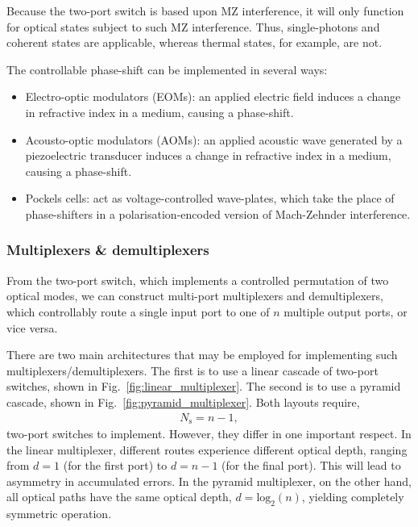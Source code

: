 \documentclass[aps, rmp, twocolumn, amsmath, amssymb, nofootinbib, superscriptaddress, longbibliography, floatfix, table-of-contents, eqsecnum]{revtex4-1}
\begin{document}
Because the two-port switch is based upon MZ interference, it will only function for optical states subject to such MZ interference. Thus, single-photons and coherent states are applicable, whereas thermal states, for example, are not.

The controllable phase-shift can be implemented in several ways:
\begin{itemize}
\item Electro-optic modulators (EOMs): an applied electric field induces a change in refractive index in a medium, causing a phase-shift.
\item Acousto-optic modulators (AOMs): an applied acoustic wave generated by a piezoelectric transducer induces a change in refractive index in a medium, causing a phase-shift.
\item Pockels cells: act as voltage-controlled wave-plates, 	which take the place of phase-shifters in a polarisation-encoded version of Mach-Zehnder interference.
\end{itemize}

%
%

\subsubsection{Multiplexers \& demultiplexers} 

From the two-port switch, which implements a controlled permutation of two optical modes, we can construct multi-port multiplexers and demultiplexers, which controllably route a single input port to one of $n$ multiple output ports, or vice versa.

There are two main architectures that may be employed for implementing such multiplexers/demultiplexers. The first is to use a linear cascade of two-port switches, shown in Fig.~\ref{fig:linear_multiplexer}. The second is to use a pyramid cascade, shown in Fig.~\ref{fig:pyramid_multiplexer}. Both layouts require,
\begin{align}
N_\mathrm{s} = n-1,
\end{align}
two-port switches to implement. However, they differ in one important respect. In the linear multiplexer, different routes experience different optical depth, ranging from \mbox{$d=1$} (for the first port) to \mbox{$d=n-1$} (for the final port). This will lead to asymmetry in accumulated errors. In the pyramid multiplexer, on the other hand, all optical paths have the same optical depth, \mbox{$d=\mathrm{log}_2(n)$}, yielding completely symmetric operation.
\end{document}
